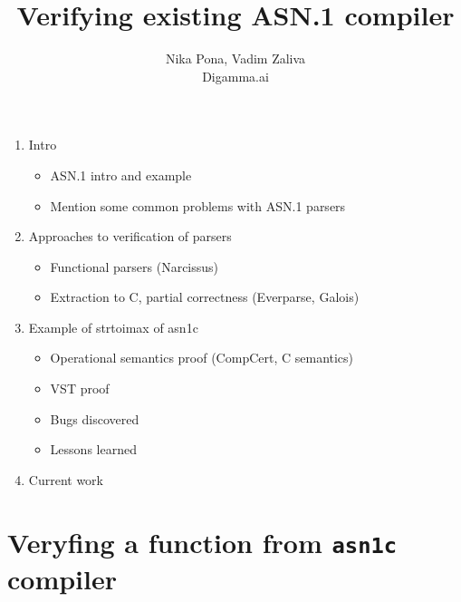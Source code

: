 \documentclass{article}
\begin{document}
\title{Verifying existing ASN.1 compiler}

\author{Nika Pona, Vadim Zaliva \\
        Digamma.ai}

\maketitle

\begin{abstract}

\end{abstract}

\begin{enumerate}

\item Intro
  \begin{itemize}
  \item ASN.1 intro and example 
  \item Mention some common problems with ASN.1 parsers
  \end{itemize}
\item Approaches to verification of parsers
  \begin{itemize}
  \item Functional parsers (Narcissus)
  \item Extraction to C, partial correctness (Everparse, Galois)
  \end{itemize}

  \item Example of strtoimax of asn1c
\begin{itemize}
  \item Operational semantics proof (CompCert, C semantics)
  \item VST proof 
    \item Bugs discovered
  \item Lessons learned
  \end{itemize}

\item Current work


\end{enumerate}

\section{Veryfing a function from \texttt{asn1c} compiler}
\end{document}
